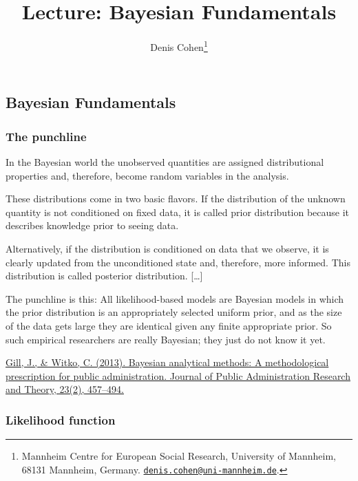 \documentclass[
  11pt,
]{article}
\title{Lecture: Bayesian Fundamentals}
\author{Denis Cohen\footnote{Mannheim Centre for European Social Research, University of Mannheim, 68131 Mannheim, Germany. \href{mailto:denis.cohen@uni-mannheim.de}{\nolinkurl{denis.cohen@uni-mannheim.de}}.}}
\date{}
\begin{document}
\maketitle

\hypertarget{bayesian-fundamentals}{%
\subsection{Bayesian Fundamentals}\label{bayesian-fundamentals}}

\hypertarget{the-punchline}{%
\subsubsection{The punchline}\label{the-punchline}}

In the Bayesian world the unobserved quantities are assigned distributional properties and, therefore, become random variables in the analysis.

These distributions come in two basic flavors. If the distribution of the unknown quantity is not conditioned on fixed data, it is called prior distribution because it describes knowledge prior to seeing data.

Alternatively, if the distribution is conditioned on data that we observe, it is clearly updated from the unconditioned state and, therefore, more informed. This distribution is called posterior distribution. {[}\ldots{]}

The punchline is this: All likelihood-based models are Bayesian models in which the prior distribution is an appropriately selected uniform prior, and as the size of the data gets large they are identical given any finite appropriate prior. So such empirical researchers are really Bayesian; they just do not know it yet.

\href{https://academic.oup.com/jpart/article/23/2/457/1003493}{Gill, J., \& Witko, C. (2013). Bayesian analytical methods: A methodological prescription for public administration. Journal of Public Administration Research and Theory, 23(2), 457--494.}

\hypertarget{likelihood-function}{%
\subsubsection{Likelihood function}\label{likelihood-function}}
\end{document}
